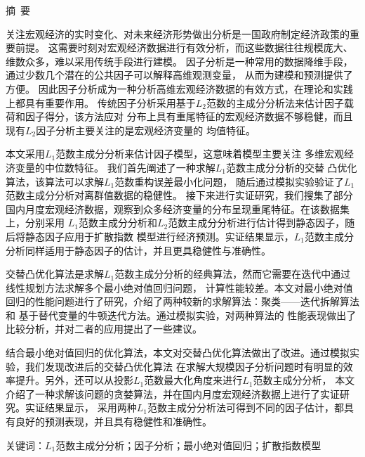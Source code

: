 

\centerline{\large\heiti 摘\ 要}

\vspace{2ex}
关注宏观经济的实时变化、对未来经济形势做出分析是一国政府制定经济政策的重要前提。
这需要时刻对宏观经济数据进行有效分析，而这些数据往往规模庞大、维数众多，难以采用传统手段进行建模。
因子分析是一种常用的数据降维手段，通过少数几个潜在的公共因子可以解释高维观测变量，
从而为建模和预测提供了方便。
因此因子分析成为一种分析高维宏观经济数据的有效方式，在理论和实践上都具有重要作用。
传统因子分析采用基于$L_2$范数的主成分分析法来估计因子载荷和因子得分，该方法应对
分布上具有重尾特征的宏观经济数据不够稳健，而且现有$L_2$因子分析主要关注的是宏观经济变量的
均值特征。

本文采用$L_1$范数主成分分析来估计因子模型，这意味着模型主要关注
多维宏观经济变量的中位数特征。
我们首先阐述了一种求解$L_1$范数主成分分析的交替
凸优化算法，该算法可以求解$L_1$范数重构误差最小化问题，
随后通过模拟实验验证了$L_1$范数主成分分析对离群值数据的稳健性。
接下来进行实证研究，我们搜集了部分
国内月度宏观经济数据，观察到众多经济变量的分布呈现重尾特征。在该数据集上，分别采用
$L_1$范数主成分分析和$L_2$范数主成分分析进行估计得到静态因子，随后将静态因子应用于扩散指数
模型进行经济预测。实证结果显示，$L_1$范数主成分分析同样适用于静态因子的估计，并且更具稳健性与准确性。

交替凸优化算法是求解$L_1$范数主成分分析的经典算法，然而它需要在迭代中通过线性规划方法求解多个最小绝对值回归问题，
计算性能较差。本文对最小绝对值回归的性能问题进行了研究，介绍了两种较新的求解算法：聚类——迭代拆解算法和
基于替代变量的牛顿迭代方法。通过模拟实验，对两种算法的
性能表现做出了比较分析，并对二者的应用提出了一些建议。

结合最小绝对值回归的优化算法，本文对交替凸优化算法做出了改进。通过模拟实验，我们发现改进后的交替凸优化算法
在求解大规模因子分析问题时有明显的效率提升。另外，还可以从投影$L_1$范数最大化角度来进行$L_1$范数主成分分析，
本文介绍了一种求解该问题的贪婪算法，并在国内月度宏观经济数据上进行了实证研究。实证结果显示，
采用两种$L_1$范数主成分分析法可得到不同的因子估计，都具有良好的预测表现，并且具有稳健性和准确性。


\vspace{2ex}
{\heiti 关键词}：$L_1$范数主成分分析；因子分析；最小绝对值回归；扩散指数模型
\thispagestyle{plain}

\newpage